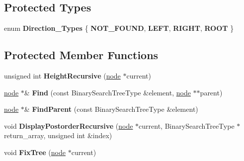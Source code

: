 \subsection*{Protected Types}
\begin{DoxyCompactItemize}
\item 
enum {\bfseries Direction\-\_\-\-Types} \{ {\bfseries N\-O\-T\-\_\-\-F\-O\-U\-N\-D}, 
{\bfseries L\-E\-F\-T}, 
{\bfseries R\-I\-G\-H\-T}, 
{\bfseries R\-O\-O\-T}
 \}
\end{DoxyCompactItemize}
\subsection*{Protected Member Functions}
\begin{DoxyCompactItemize}
\item 
\hypertarget{class_data_structures_1_1_binary_search_tree_a2b11c7d903e037a726decc1cd866d4e7}{unsigned int {\bfseries Height\-Recursive} (\hyperlink{struct_data_structures_1_1_binary_search_tree_1_1node}{node} $\ast$current)}\label{class_data_structures_1_1_binary_search_tree_a2b11c7d903e037a726decc1cd866d4e7}

\item 
\hypertarget{class_data_structures_1_1_binary_search_tree_a0196a589767ca99d7a7caa9b41225817}{\hyperlink{struct_data_structures_1_1_binary_search_tree_1_1node}{node} $\ast$\& {\bfseries Find} (const Binary\-Search\-Tree\-Type \&element, \hyperlink{struct_data_structures_1_1_binary_search_tree_1_1node}{node} $\ast$$\ast$parent)}\label{class_data_structures_1_1_binary_search_tree_a0196a589767ca99d7a7caa9b41225817}

\item 
\hypertarget{class_data_structures_1_1_binary_search_tree_abf40adb877ad2b915da8d05bc603b98d}{\hyperlink{struct_data_structures_1_1_binary_search_tree_1_1node}{node} $\ast$\& {\bfseries Find\-Parent} (const Binary\-Search\-Tree\-Type \&element)}\label{class_data_structures_1_1_binary_search_tree_abf40adb877ad2b915da8d05bc603b98d}

\item 
\hypertarget{class_data_structures_1_1_binary_search_tree_ae01518754ae96d9df3df3ccd0b65fb15}{void {\bfseries Display\-Postorder\-Recursive} (\hyperlink{struct_data_structures_1_1_binary_search_tree_1_1node}{node} $\ast$current, Binary\-Search\-Tree\-Type $\ast$return\-\_\-array, unsigned int \&index)}\label{class_data_structures_1_1_binary_search_tree_ae01518754ae96d9df3df3ccd0b65fb15}

\item 
\hypertarget{class_data_structures_1_1_binary_search_tree_ac9695192b853884f7accb60c157b5ab7}{void {\bfseries Fix\-Tree} (\hyperlink{struct_data_structures_1_1_binary_search_tree_1_1node}{node} $\ast$current)}\label{class_data_structures_1_1_binary_search_tree_ac9695192b853884f7accb60c157b5ab7}

\end{DoxyCompactItemize}
